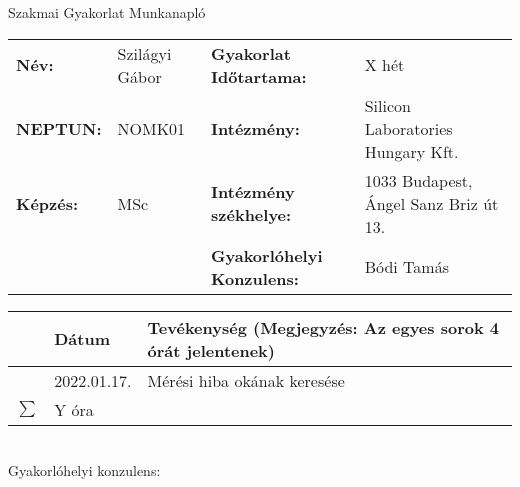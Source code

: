 \documentclass[10pt,a4paper,oneside]{report}
\newcounter{magicrownumbers}
\newcommand\rownum{\stepcounter{magicrownumbers}\arabic{magicrownumbers}}
\begin{document}
\begin{center}
	\Large{Szakmai Gyakorlat Munkanapló}
\end{center}
\begin{tabular}{p{2.5 cm} p{2.5 cm} p{5 cm} p{6 cm}}
	\textbf{Név:} & Szilágyi Gábor & \textbf{Gyakorlat Időtartama:} & X hét\\
	\textbf{NEPTUN:} & NOMK01 & \textbf{Intézmény:} & Silicon Laboratories Hungary Kft.\\
	\textbf{Képzés:} & MSc & \textbf{Intézmény székhelye:} & 1033 Budapest, Ángel Sanz Briz út 13. \\
	& & \textbf{Gyakorlóhelyi Konzulens:} & Bódi Tamás
\end{tabular}
\begin{table}[h!]
	\centering
	\small
	\begin{tabular}{| c | p{3 cm} | p{10 cm} |}
	\hline
	 & Dátum & Tevékenység (Megjegyzés: Az egyes sorok 4 órát jelentenek) \\ \hline \hline
	\rownum & 2022.01.17. & Mérési hiba okának keresése \\ \hline
	$\sum$ & Y óra& \\ \hline
	\end{tabular}
\end{table}
\vspace{.5 cm} \\
Gyakorlóhelyi konzulens:
\end{document}
